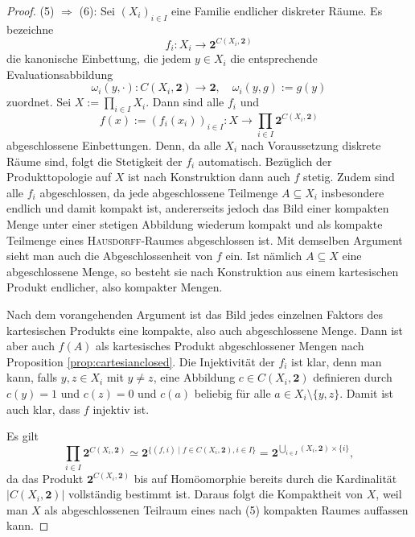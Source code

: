 \begin{proof}
  (5) $\Rightarrow$ (6):
  Sei $(X_i)_{i \in I}$ eine Familie endlicher diskreter Räume.
  Es bezeichne
  \begin{displaymath}
    f_i \colon X_i \to \mathbf{2}^{C(X_i,\mathbf{2})}
  \end{displaymath}
  die kanonische Einbettung, die jedem  $y \in X_i$ die entsprechende Evaluationsabbildung
  \begin{displaymath}
    \omega_i(y,\cdot) \colon C(X_i,\mathbf{2}) \to \mathbf{2}, \quad \omega_i(y,g) := g(y)
  \end{displaymath}
  zuordnet.
  Sei $X := \prod_{i \in I} X_i$.
  Dann sind alle $f_i$  und
  \begin{displaymath}
    f(x) := (f_i(x_i))_{i \in I} \colon X \to \prod_{i \in I} \mathbf{2}^{C(X_i,\mathbf{2})}
  \end{displaymath}
  abgeschlossene Einbettungen.
  Denn, da alle $X_i$ nach Voraussetzung diskrete Räume sind, folgt die Stetigkeit der $f_i$ automatisch.
  Bezüglich der Produkttopologie auf $X$ ist nach Konstruktion dann auch $f$ stetig.
  Zudem sind alle $f_i$ abgeschlossen, da jede abgeschlossene Teilmenge $A \subseteq X_i$ insbesondere endlich und damit kompakt ist, andererseits jedoch das Bild einer kompakten Menge unter einer stetigen Abbildung wiederum kompakt und als kompakte Teilmenge eines \textsc{Hausdorff}\hyp{}Raumes abgeschlossen ist.  
  Mit demselben Argument sieht man auch die Abgeschlossenheit von $f$ ein.
  Ist nämlich $A \subseteq X$ eine abgeschlossene Menge, so besteht sie nach Konstruktion aus einem kartesischen Produkt endlicher, also kompakter Mengen.

  Nach dem vorangehenden Argument ist das Bild jedes einzelnen Faktors des kartesischen Produkts eine kompakte, also auch abgeschlossene Menge.
  Dann ist aber auch $f(A)$ als kartesisches Produkt abgeschlossener Mengen nach Proposition \ref{prop:cartesianclosed}.
  Die Injektivität der $f_i$ ist klar, denn man kann, falls $y,z \in X_i$ mit $y \neq z$, eine Abbildung $c \in C(X_i,\mathbf{2})$ definieren durch $c(y) = 1$ und $c(z) = 0$ und $c(a)$ beliebig für alle $a \in X_i \setminus \{y,z\}$.
  Damit ist auch klar, dass $f$ injektiv ist.
   
  Es gilt 
  \begin{displaymath}
    \prod_{i \in I} \mathbf{2}^{C(X_i,\mathbf{2})} 
    \simeq \mathbf{2}^{\{(f,i) \mid f \in C(X_i,\mathbf{2}), i \in I\}}
    = \mathbf{2}^{\bigcup_{i \in I} (X_i,\mathbf{2}) \times \{i\}},
  \end{displaymath}
  da das Produkt $\mathbf{2}^{C(X_i,\mathbf{2})}$ bis auf Homöomorphie bereits durch die Kardinalität $|C( X_i, \mathbf{2} )|$ vollständig bestimmt ist.
  Daraus folgt die Kompaktheit von $X$, weil man $X$ als abgeschlossenen Teilraum eines nach (5) kompakten Raumes auffassen kann.


\end{proof}
